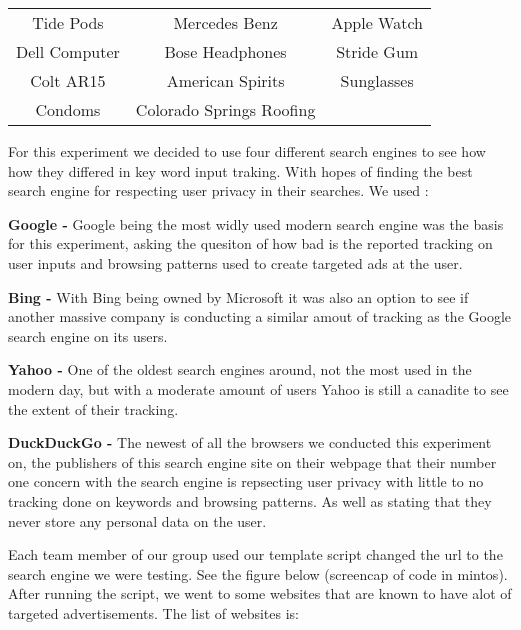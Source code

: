 \documentclass{article}
\begin{document}
\begin{tabular}{ c c c }
	
	\hline
	
	Tide Pods     & Mercedes Benz            & Apple Watch \\ 
	Dell Computer & Bose Headphones          & Stride Gum  \\  
	Colt AR15     & American Spirits         & Sunglasses  \\
	Condoms       & Colorado Springs Roofing &             \\
	
	\hline
\end{tabular}

For this experiment we decided to use four different search engines to see how how they differed in key word input traking. With hopes of finding the best search engine for respecting user privacy in their searches. We used :

\textbf{Google -} Google being the most widly used modern search engine was the basis for this experiment, asking the quesiton of how bad is the reported tracking on user inputs and browsing patterns used to create targeted ads at the user.

\textbf{Bing -} With Bing being owned by Microsoft it was also an option to see if another massive company is conducting a similar amout of tracking as the Google search engine on its users.

\textbf{Yahoo -} One of the oldest search engines around, not the most used in the modern day, but with a moderate amount of users Yahoo is still a canadite to see the extent of their tracking.

\textbf{DuckDuckGo - } The newest of all the browsers we conducted this experiment on, the publishers of this search engine site on their webpage that their number one concern with the search engine is repsecting user privacy with little to no tracking done on keywords and browsing patterns. As well as stating that they never store any personal data on the user.

\qquad Each team member of our group used our template script changed the url to the search engine we were testing. See the figure below (screencap of code in mintos). After running the script, we went to some websites that are known to have alot of targeted advertisements. The list of websites is:
\end{document}
